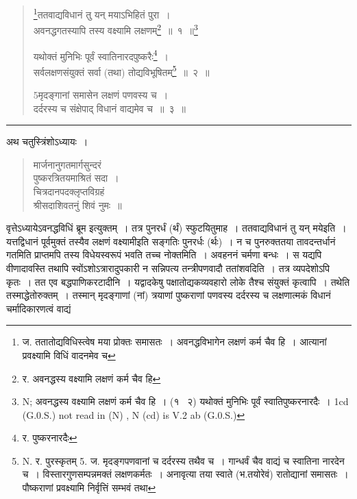 \documentclass[11pt, openany]{book}
\begin{document}
\begin{quote}
{\na  \renewcommand{\thefootnote}{1}\footnote{ज. ततातोद्यविधिस्त्वेष मया प्रोक्तः समासतः~। अवनद्धविभागेन लक्षणं कर्म चैव हि~। आत्यानां प्रवक्ष्यामि विधिं वादनमेव च}ततवाद्यविधानं तु यन् मयाऽभिहितं पुरा~।\\
 अवनद्धगतस्यापि तस्य वक्ष्यामि लक्षणम्\renewcommand{\thefootnote}{2}\footnote{र. अवनद्धस्य वक्ष्यामि लक्षणं कर्म चैव हि}~॥~१~॥\renewcommand{\thefootnote}{2a}\footnote{N; अवनद्धस्य
वक्ष्यामि लक्षणं कर्म चैव हि~।  (१ \textendash\ २) यथोक्तं मुनिभिः पूर्वं स्वातिपुष्करनारदैः~। 1cd (G.0.S.) not read in (N) , N (cd) is V.2 ab (G.0.S.)}

 यथोक्तं मुनिभिः पूर्वं स्वातिनारदपुष्करैः\renewcommand{\thefootnote}{3}\footnote{र. पुष्करनारदैः}~।\\
 सर्वलक्षणसंयुक्तं सर्वा (तथा) तोद्यविभूषितम्\renewcommand{\thefootnote}{4}\footnote{N. र. पुरस्कृतम् 5. ज. मृदङ्गपणवानां च दर्दरस्य तथैव च~। गान्धर्वं चैव वाद्यं च स्वातिना नारदेन च~। विस्तारगुणसम्पन्नमक्तं लक्षणकर्मतः~। अनावृत्या तया स्वाते  (भ.तयोरेवं) रातोद्यानां समासतः~। पौष्कराणां प्रवक्ष्यामि निर्वृत्तिं सम्भवं तथा}~॥~२~॥

 5मृदङ्गानां समासेन लक्षणं पणवस्य च~।\\
 दर्दरस्य च संक्षेपाद् विधानं वाद्यमेव च~॥~३~॥}
\end{quote}

\hrule
 
\begin{center}
अथ चतुस्त्रिंशोऽध्यायः~। 
\end{center}

\begin{quote}
{\qt मार्जनानुगतमार्गसुन्दरं\\
पुष्करत्रितयमाश्रितं सदा~।\\
चित्रदानपदक्लृप्तविग्रहं\\
श्रीसदाशिवतनुं शिवं नुमः~॥}
\end{quote}

वृत्तेऽध्यायेऽवनद्धविधिं ब्रूम इत्युक्तम्~। तत्र पुनरर्धं (र्थं)  स्फुटयितुमाह~। {\qtt ततवाद्यविधानं तु यन्  मयेइति}~। यत्तद्विधानं पूर्वमुक्तं तस्यैव लक्षणं वक्ष्यामीइति सङ्गतिः पुनरर्धः (र्थः)~। न च पुनरुक्ततया तावदन्तर्धानं गतमिति प्राप्तमपि तस्य विधेयस्वरूपं भवति तच्च नोक्तमिति~। अवहननं चर्मणा बन्धः~। स यद्यपि वीणादावस्ति तथापि स्वोंऽशोऽत्रारादुपकारी न सन्निपत्य तन्त्रीपणवादौ ततांशवदिति~। तत्र व्यपदेशोऽपि कृतः~। तत एव बद्धपाणिकरटादीनि~। यद्वादकेषु पक्षातोद्यकव्यवहारो लोके तैश्च संयुक्तं कृत्वापि~। तथेति तस्माद्धेतोरुक्तम्~। तस्मान् मृदङ्गाणां (नां) त्रयाणां पुष्कराणां पणवस्य दर्दरस्य च लक्षणात्मकं विधानं चर्मादिकारणत्वं वाद्यं
\end{document}
